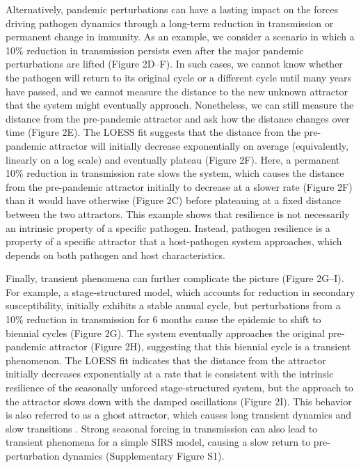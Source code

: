 \documentclass[12pt]{article}
\begin{document}
Alternatively, pandemic perturbations can have a lasting impact on the forces driving pathogen dynamics through a long-term reduction in transmission or permanent change in immunity.
As an example, we consider a scenario in which a 10\% reduction in transmission persists even after the major pandemic perturbations are lifted (Figure 2D--F).
In such cases, we cannot know whether the pathogen will return to its original cycle or a different cycle until many years have passed, and we cannot measure the distance to the new unknown attractor that the system might eventually approach.
Nonetheless, we can still measure the distance from the pre-pandemic attractor and ask how the distance changes over time (Figure 2E).
The LOESS fit suggests that the distance from the pre-pandemic attractor will initially decrease exponentially on average (equivalently, linearly on a log scale) and eventually plateau (Figure 2F).
Here, a permanent 10\% reduction in transmission rate slows the system, which causes the distance from the pre-pandemic attractor initially to decrease at a slower rate (Figure 2F) than it would have otherwise (Figure 2C) before plateauing at a fixed distance between the two attractors.
This example shows that resilience is not necessarily an intrinsic property of a specific pathogen.
Instead, pathogen resilience is a property of a specific attractor that a host-pathogen system approaches, which depends on both pathogen and host characteristics.

Finally, transient phenomena can further complicate the picture (Figure 2G--I).
For example, a stage-structured model, which accounts for reduction in secondary susceptibility, initially exhibits a stable annual cycle, but perturbations from a 10\% reduction in transmission for 6 months cause the epidemic to shift to biennial cycles (Figure 2G).
The system eventually approaches the original pre-pandemic attractor (Figure 2H), suggesting that this biennial cycle is a transient phenomenon.
The LOESS fit indicates that the distance from the attractor initially decreases exponentially at a rate that is consistent with the intrinsic resilience of the seasonally unforced stage-structured system, but the approach to the attractor slows down with the damped oscillations (Figure 2I).
This behavior is also referred to as a ghost attractor, which causes long transient dynamics and slow transitions \citep{hastings2018transient}.
Strong seasonal forcing in transmission can also lead to transient phenomena for a simple SIRS model, causing a slow return to pre-perturbation dynamics (Supplementary Figure S1).
\end{document}
